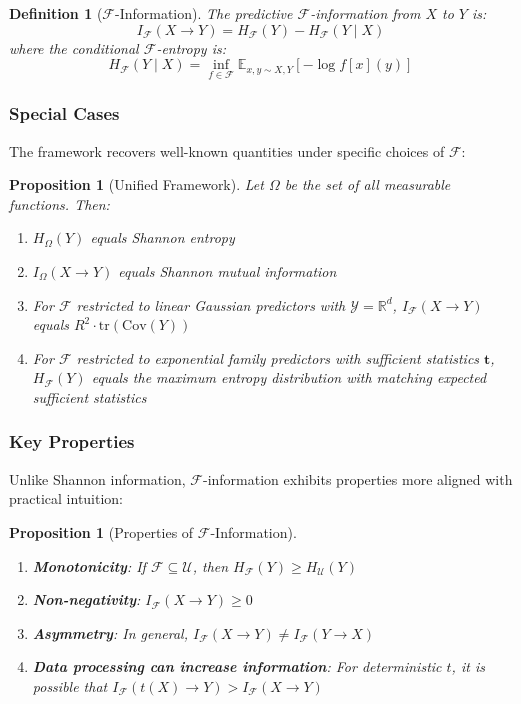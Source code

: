 \documentclass[11pt]{article}
\newtheorem{proposition}[theorem]{Proposition}
\newtheorem{definition}[theorem]{Definition}
\newcommand{\E}{\mathbb{E}}
\newcommand{\R}{\mathbb{R}}
\newcommand{\Y}{\mathcal{Y}}
\newcommand{\F}{\mathcal{F}}
\newcommand{\Cov}{\mathrm{Cov}}
\newcommand{\tr}{\mathrm{tr}}
\begin{document}
\begin{definition}[$\F$-Information]
The predictive $\F$-information from $X$ to $Y$ is:
\begin{equation}
I_\F(X \to Y) = H_\F(Y) - H_\F(Y \mid X)
\end{equation}
where the conditional $\F$-entropy is:
\begin{equation}
H_\F(Y \mid X) = \inf_{f \in \F} \E_{x,y \sim X,Y}\left[-\log f[x](y)\right]
\end{equation}
\end{definition}

\subsubsection{Special Cases}

The framework recovers well-known quantities under specific choices of $\F$:

\begin{proposition}[Unified Framework]
Let $\Omega$ be the set of all measurable functions. Then:
\begin{enumerate}
    \item $H_\Omega(Y)$ equals Shannon entropy
    \item $I_\Omega(X \to Y)$ equals Shannon mutual information
    \item For $\F$ restricted to linear Gaussian predictors with $\Y = \R^d$, $I_\F(X \to Y)$ equals $R^2 \cdot \tr(\Cov(Y))$
    \item For $\F$ restricted to exponential family predictors with sufficient statistics $\mathbf{t}$, $H_\F(Y)$ equals the maximum entropy distribution with matching expected sufficient statistics
\end{enumerate}
\end{proposition}

\subsubsection{Key Properties}

Unlike Shannon information, $\F$-information exhibits properties more aligned with practical intuition:

\begin{proposition}[Properties of $\F$-Information]
\begin{enumerate}
    \item \textbf{Monotonicity}: If $\F \subseteq \mathcal{U}$, then $H_\F(Y) \geq H_\mathcal{U}(Y)$
    \item \textbf{Non-negativity}: $I_\F(X \to Y) \geq 0$
    \item \textbf{Asymmetry}: In general, $I_\F(X \to Y) \neq I_\F(Y \to X)$
    \item \textbf{Data processing can increase information}: For deterministic $t$, it is possible that $I_\F(t(X) \to Y) > I_\F(X \to Y)$
\end{enumerate}
\end{proposition}
\end{document}
